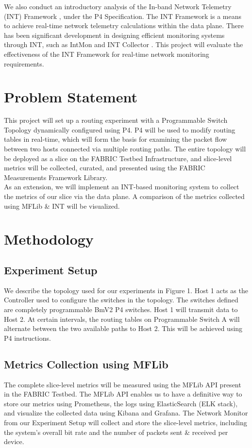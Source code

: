 \documentclass[conference]{IEEEtran}
\begin{document}
We also conduct an introductory analysis of the In-band Network Telemetry (INT) Framework \cite{b4}, under the P4 Specification. The INT Framework is a means to achieve real-time network telemetry calculations within the data plane. There has been significant development in designing efficient monitoring systems through INT, such as IntMon \cite{b5} and INT Collector \cite{b6}. This project will evaluate the effectiveness of the INT Framework for real-time network monitoring requirements.

\section{Problem Statement}
This project will set up a routing experiment with a Programmable Switch Topology dynamically configured using P4. P4 will be used to modify routing tables in real-time, which will form the basis for examining the packet flow between two hosts connected via multiple routing paths. The entire topology will be deployed as a slice on the FABRIC Testbed Infrastructure, and slice-level metrics will be collected, curated, and presented using the FABRIC Measurements Framework Library. \\

As an extension, we will implement an INT-based monitoring system to collect the metrics of our slice via the data plane. A comparison of the metrics collected using MFLib \& INT will be visualized.

\section{Methodology}
\subsection{Experiment Setup}
We describe the topology used for our experiments in Figure 1. Host 1 acts as the Controller used to configure the switches in the topology. The switches defined are completely programmable BmV2 P4 switches. Host 1 will transmit data to Host 2. At certain intervals, the routing tables on Programmable Switch A will alternate between the two available paths to Host 2. This will be achieved using P4 instructions.
 
\subsection{Metrics Collection using MFLib}
The complete slice-level metrics will be measured using the MFLib API present in the FABRIC Testbed. The MFLib API enables us to have a definitive way to store our metrics using Prometheus, the logs using ElasticSearch (ELK stack), and visualize the collected data using Kibana and Grafana. The Network Monitor from our Experiment Setup will collect and store the slice-level metrics, including the system's overall bit rate and the number of packets sent \& received per device.
\end{document}
